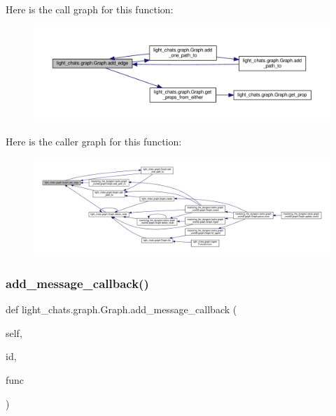 Here is the call graph for this function\+:
\nopagebreak
\begin{figure}[H]
\begin{center}
\leavevmode
\includegraphics[width=350pt]{classlight__chats_1_1graph_1_1Graph_ab343f587ca9bf3b7576fbe93e537dbca_cgraph}
\end{center}
\end{figure}
Here is the caller graph for this function\+:
\nopagebreak
\begin{figure}[H]
\begin{center}
\leavevmode
\includegraphics[width=350pt]{classlight__chats_1_1graph_1_1Graph_ab343f587ca9bf3b7576fbe93e537dbca_icgraph}
\end{center}
\end{figure}
\mbox{\label{classlight__chats_1_1graph_1_1Graph_ad445b8282327b777a3419b2a5309237a}} 
\subsubsection{\texorpdfstring{add\+\_\+message\+\_\+callback()}{add\_message\_callback()}}
{\footnotesize\ttfamily def light\+\_\+chats.\+graph.\+Graph.\+add\+\_\+message\+\_\+callback (\begin{DoxyParamCaption}\item[{}]{self,  }\item[{}]{id,  }\item[{}]{func }\end{DoxyParamCaption})}

